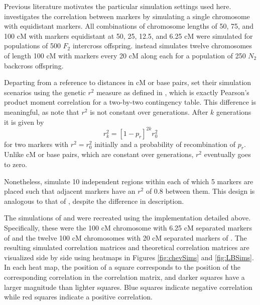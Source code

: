 \documentclass[sts]{imsart}
\begin{document}
Previous literature motivates the particular simulation settings used here. \cite{cheverud2001} investigates the correlation between markers by simulating a single chromosome with equidistant markers. All combinations of chromosome lengths of 50, 75, and 100 cM with markers equidistant at 50, 25, 12.5, and 6.25 cM were simulated for populations of 500 $F_2$ intercross offspring. \cite{LanderBotstein1989} instead simulates twelve chromosomes of length 100 cM with markers every 20 cM along each for a population of 250 $N_2$ backcross offspring.

Departing from a reference to distances in cM or base pairs, \cite{LiJi2005} set their simulation scenarios using the genetic $r^2$ measure as defined in \cite{hillrobertson1968}, which is exactly Pearson's product moment correlation for a two-by-two contingency table.
This difference is meaningful, as \cite{siegmundyakir2007} note that $r^2$ is not constant over generations. After $k$ generations it is given by
$$r_k^2 = \left [ 1 - p_r \right ]^{2k}  r^2_0$$
for two markers with $r^2 = r^2_0$ initially and a probability of recombination of $p_r$. Unlike cM or base pairs, which are constant over generations, $r^2$ eventually goes to zero.

Nonetheless, \cite{LiJi2005} simulate 10 independent regions within each of which 5 markers are placed such that adjacent markers have an $r^2$ of 0.8 between them. This design is analogous to that of \cite{LanderBotstein1989}, despite the difference in description.

The simulations of \cite{cheverud2001} and \cite{LanderBotstein1989} were recreated using the implementation detailed above. Specifically, these were the 100 cM chromosome with 6.25 cM separated markers of \cite{cheverud2001} and the twelve 100 cM chromosomes with 20 cM separated markers of \cite{LanderBotstein1989}. The resulting simulated correlation matrices and theoretical correlation matrices are visualized side by side using heatmaps in Figures \ref{fig:chevSims} and \ref{fig:LBSims}. In each heat map, the position of a square corresponds to the position of the corresponding correlation in the correlation matrix, and darker squares have a larger magnitude than lighter squares. Blue squares indicate negative correlation while red squares indicate a positive correlation.
\end{document}
